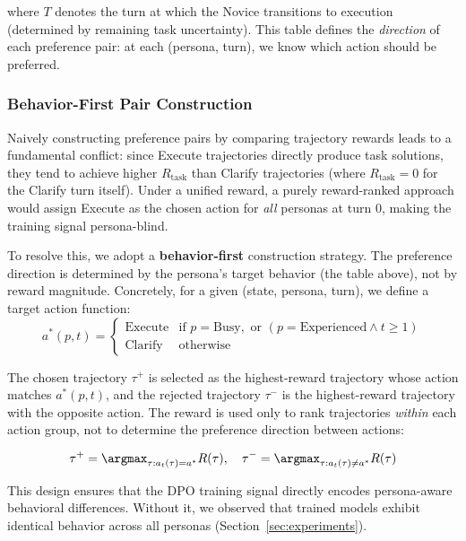 where $T$ denotes the turn at which the Novice transitions to execution (determined by remaining task uncertainty). This table defines the \emph{direction} of each preference pair: at each (persona, turn), we know which action should be preferred.

\subsubsection{Behavior-First Pair Construction}

Naively constructing preference pairs by comparing trajectory rewards leads to a fundamental conflict: since Execute trajectories directly produce task solutions, they tend to achieve higher $R_{\text{task}}$ than Clarify trajectories (where $R_{\text{task}} = 0$ for the Clarify turn itself). Under a unified reward, a purely reward-ranked approach would assign Execute as the chosen action for \emph{all} personas at turn 0, making the training signal persona-blind.

To resolve this, we adopt a \textbf{behavior-first} construction strategy. The preference direction is determined by the persona's target behavior (the table above), not by reward magnitude. Concretely, for a given (state, persona, turn), we define a target action function:
\begin{equation}
a^*(p, t) = \begin{cases}
\text{Execute} & \text{if } p = \text{Busy}, \text{ or } (p = \text{Experienced} \wedge t \geq 1) \\
\text{Clarify} & \text{otherwise}
\end{cases}
\end{equation}

The chosen trajectory $\tau^+$ is selected as the highest-reward trajectory whose action matches $a^*(p, t)$, and the rejected trajectory $\tau^-$ is the highest-reward trajectory with the opposite action. The reward is used only to rank trajectories \emph{within} each action group, not to determine the preference direction between actions:

\begin{equation}
\tau^+ = \argmax_{\tau : a_t(\tau) = a^*} R(\tau), \quad
\tau^- = \argmax_{\tau : a_t(\tau) \neq a^*} R(\tau)
\end{equation}

This design ensures that the DPO training signal directly encodes persona-aware behavioral differences. Without it, we observed that trained models exhibit identical behavior across all personas (Section~\ref{sec:experiments}).

